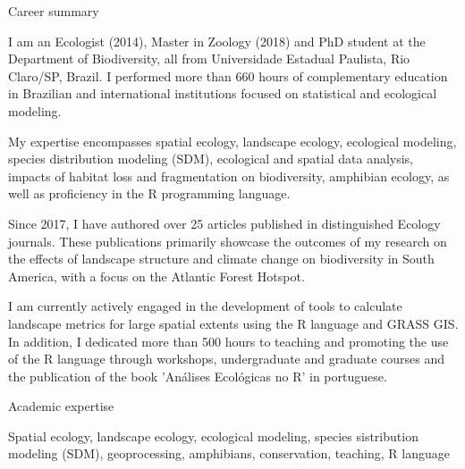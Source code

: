 \documentclass{resume}
\begin{document}

\begin{rSection}{Career summary}

I am an Ecologist (2014), Master in Zoology (2018) and PhD student at the Department of Biodiversity, all from Universidade Estadual Paulista, Rio Claro/SP, Brazil. I performed more than 660 hours of complementary education in Brazilian and international institutions focused on statistical and ecological modeling. 

My expertise encompasses spatial ecology, landscape ecology, ecological modeling, species distribution modeling (SDM), ecological and spatial data analysis, impacts of habitat loss and fragmentation on biodiversity, amphibian ecology, as well as proficiency in the R programming language. 

Since 2017, I have authored over 25 articles published in distinguished Ecology journals. These publications primarily showcase the outcomes of my research on the effects of landscape structure and climate change on biodiversity in South America, with a focus on the Atlantic Forest Hotspot.

I am currently actively engaged in the development of tools to calculate landscape metrics for large spatial extents using the R language and GRASS GIS. In addition, I dedicated more than 500 hours to teaching and promoting the use of the R language through workshops, undergraduate and graduate courses and the publication of the book 'Análises Ecológicas no R' in portuguese.

\end{rSection}


\begin{rSection}{Academic expertise}

Spatial ecology, landscape ecology, ecological modeling, species sistribution modeling (SDM), geoprocessing, amphibians, conservation, teaching, R language

\end{rSection}

\end{document}
